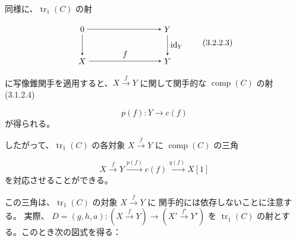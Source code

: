 \clearpage
{}%
同様に、$\operatorname{tr}_1(C)$ の射

\begin{equation}
  \begin{tikzpicture}[>=stealth,baseline=(current bounding box.center)]
    \node (Z)  at (0,1.35) {$0$};
    \node (Y)  at (3.6,1.35) {$Y$};
    \node (X)  at (0,0) {$X$};
    \node (Yp) at (3.6,0) {$Y$};
    \draw[->] (Z) -- (Y);
    \draw[->] (Z) -- (X);
    \draw[->] (Y) -- node[right] {$\operatorname{id}_Y$} (Yp);
    \draw[->] (X) -- node[above] {$f$} (Yp);
  \end{tikzpicture}
  \tag{3.2.2.3}
\end{equation}

に写像錐関手を適用すると、$X\xrightarrow{f}Y$ に関して関手的な
$\operatorname{comp}(C)$ の射 (3.1.2.4)

\begin{equation}
  p(f)\colon Y\longrightarrow c(f)
  \tag{3.2.2.4}
\end{equation}
が得られる。

したがって、$\operatorname{tr}_1(C)$ の各対象 $X\xrightarrow{f}Y$ に
$\operatorname{comp}(C)$ の三角

\begin{equation}
  X\xrightarrow{f}Y\xrightarrow{p(f)}c(f)\xrightarrow{q(f)}X[1]
  \tag{3.2.2.5}
\end{equation}
を対応させることができる。

この三角は、$\operatorname{tr}_1(C)$ の対象 $X\xrightarrow{f}Y$ に
関手的には依存しないことに注意する。
実際、
$D=(g,h,a)\colon(X\xrightarrow{f}Y)\longrightarrow
(X'\xrightarrow{f'}Y')$
を $\operatorname{tr}_1(C)$ の射とする。このとき次の図式を得る：

